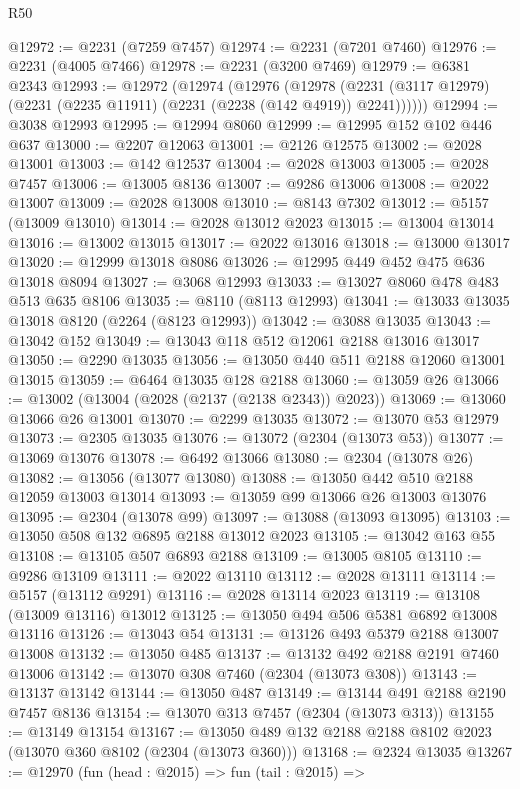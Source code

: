 \begin{lexlean}{R50}
\begin{coremodule}
@12972 := @2231 (@7259 @7457)
@12974 := @2231 (@7201 @7460)
@12976 := @2231 (@4005 @7466)
@12978 := @2231 (@3200 @7469)
@12979 := @6381 @2343
@12993 := @12972
    (@12974
      (@12976
        (@12978 (@2231 (@3117 @12979) (@2231 (@2235 @11911) (@2231 (@2238 (@142 @4919)) @2241))))))
@12994 := @3038 @12993
@12995 := @12994 @8060
@12999 := @12995 @152 @102 @446 @637
@13000 := @2207 @12063
@13001 := @2126 @12575
@13002 := @2028 @13001
@13003 := @142 @12537
@13004 := @2028 @13003
@13005 := @2028 @7457
@13006 := @13005 @8136
@13007 := @9286 @13006
@13008 := @2022 @13007
@13009 := @2028 @13008
@13010 := @8143 @7302
@13012 := @5157 (@13009 @13010)
@13014 := @2028 @13012 @2023
@13015 := @13004 @13014
@13016 := @13002 @13015
@13017 := @2022 @13016
@13018 := @13000 @13017
@13020 := @12999 @13018 @8086
@13026 := @12995 @449 @452 @475 @636 @13018 @8094
@13027 := @3068 @12993
@13033 := @13027 @8060 @478 @483 @513 @635 @8106
@13035 := @8110 (@8113 @12993)
@13041 := @13033 @13035 @13018 @8120 (@2264 (@8123 @12993))
@13042 := @3088 @13035
@13043 := @13042 @152
@13049 := @13043 @118 @512 @12061 @2188 @13016 @13017
@13050 := @2290 @13035
@13056 := @13050 @440 @511 @2188 @12060 @13001 @13015
@13059 := @6464 @13035 @128 @2188
@13060 := @13059 @26
@13066 := @13002 (@13004 (@2028 (@2137 (@2138 @2343)) @2023))
@13069 := @13060 @13066 @26 @13001
@13070 := @2299 @13035
@13072 := @13070 @53 @12979
@13073 := @2305 @13035
@13076 := @13072 (@2304 (@13073 @53))
@13077 := @13069 @13076
@13078 := @6492 @13066
@13080 := @2304 (@13078 @26)
@13082 := @13056 (@13077 @13080)
@13088 := @13050 @442 @510 @2188 @12059 @13003 @13014
@13093 := @13059 @99 @13066 @26 @13003 @13076
@13095 := @2304 (@13078 @99)
@13097 := @13088 (@13093 @13095)
@13103 := @13050 @508 @132 @6895 @2188 @13012 @2023
@13105 := @13042 @163 @55
@13108 := @13105 @507 @6893 @2188
@13109 := @13005 @8105
@13110 := @9286 @13109
@13111 := @2022 @13110
@13112 := @2028 @13111
@13114 := @5157 (@13112 @9291)
@13116 := @2028 @13114 @2023
@13119 := @13108 (@13009 @13116) @13012
@13125 := @13050 @494 @506 @5381 @6892 @13008 @13116
@13126 := @13043 @54
@13131 := @13126 @493 @5379 @2188 @13007 @13008
@13132 := @13050 @485
@13137 := @13132 @492 @2188 @2191 @7460 @13006
@13142 := @13070 @308 @7460 (@2304 (@13073 @308))
@13143 := @13137 @13142
@13144 := @13050 @487
@13149 := @13144 @491 @2188 @2190 @7457 @8136
@13154 := @13070 @313 @7457 (@2304 (@13073 @313))
@13155 := @13149 @13154
@13167 := @13050 @489 @132 @2188 @2188 @8102 @2023 (@13070 @360 @8102 (@2304 (@13073 @360)))
@13168 := @2324 @13035
@13267 := @12970
    (fun (head : @2015) =>
    fun (tail : @2015) =>

\end{coremodule}
\end{lexlean}
